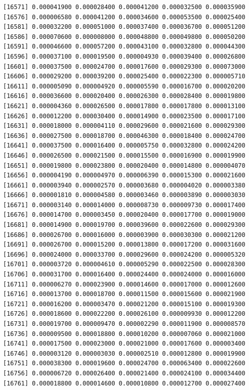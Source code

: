 \documentclass[]{article}
\begin{document}
\begin{verbatim}
[16571] 0.000041900 0.000028400 0.000041200 0.000032500 0.000035900
[16576] 0.000006580 0.000041200 0.000034600 0.000053500 0.000025400
[16581] 0.000032200 0.000051000 0.000037400 0.000036700 0.000051200
[16586] 0.000070600 0.000008000 0.000048800 0.000049800 0.000050200
[16591] 0.000046600 0.000057200 0.000043100 0.000032800 0.000044300
[16596] 0.000037100 0.000019500 0.000004930 0.000039400 0.000026800
[16601] 0.000037500 0.000024700 0.000017600 0.000029300 0.000073000
[16606] 0.000029200 0.000039200 0.000025400 0.000022300 0.000005710
[16611] 0.000005090 0.000004920 0.000005590 0.000016700 0.000020200
[16616] 0.000036600 0.000020400 0.000026300 0.000028400 0.000019800
[16621] 0.000004360 0.000026500 0.000017800 0.000017800 0.000013100
[16626] 0.000012200 0.000030400 0.000014900 0.000023500 0.000017100
[16631] 0.000018000 0.000004110 0.000029600 0.000021600 0.000029300
[16636] 0.000027500 0.000018700 0.000046300 0.000018400 0.000024700
[16641] 0.000037500 0.000016400 0.000005750 0.000032800 0.000024200
[16646] 0.000026500 0.000021500 0.000015500 0.000016900 0.000019900
[16651] 0.000019800 0.000023800 0.000020400 0.000014800 0.000004070
[16656] 0.000004190 0.000004970 0.000006390 0.000015300 0.000021600
[16661] 0.000003940 0.000002570 0.000003680 0.000004020 0.000003380
[16666] 0.000001810 0.000004580 0.000003460 0.000003890 0.000003030
[16671] 0.000003140 0.000014000 0.000008730 0.000009730 0.000017400
[16676] 0.000014700 0.000003450 0.000020400 0.000017700 0.000019000
[16681] 0.000014900 0.000019700 0.000039600 0.000022600 0.000029300
[16686] 0.000026700 0.000016000 0.000003900 0.000030300 0.000021200
[16691] 0.000026700 0.000015200 0.000013800 0.000017200 0.000031600
[16696] 0.000024000 0.000033700 0.000029600 0.000024200 0.000005320
[16701] 0.000003720 0.000004610 0.000005290 0.000022500 0.000028300
[16706] 0.000031700 0.000016400 0.000024400 0.000024000 0.000016000
[16711] 0.000006270 0.000023900 0.000014600 0.000017000 0.000012600
[16716] 0.000013700 0.000018700 0.000011500 0.000015600 0.000021900
[16721] 0.000016200 0.000003470 0.000021200 0.000015100 0.000019300
[16726] 0.000018600 0.000022200 0.000026100 0.000009930 0.000012200
[16731] 0.000019700 0.000009470 0.000002290 0.000011900 0.000008570
[16736] 0.000009500 0.000018800 0.000010200 0.000007060 0.000021000
[16741] 0.000017500 0.000023000 0.000021000 0.000017600 0.000003400
[16746] 0.000003120 0.000003030 0.000002510 0.000012800 0.000019900
[16751] 0.000038300 0.000019600 0.000024700 0.000063400 0.000022600
[16756] 0.000006720 0.000026400 0.000021400 0.000024100 0.000034400
[16761] 0.000018800 0.000014600 0.000010800 0.000012700 0.000027400

\end{verbatim}
\end{document}
